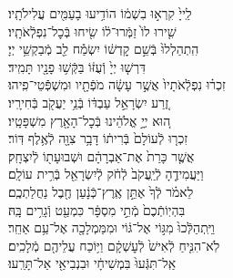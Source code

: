 \documentclass[twoside, openany, parskip=half, 11pt]{book}
\begin{document}
\begin{narrow}
לַֽייָ֙ קִרְא֣וּ בִשְׁמ֔וֹ \hfill
הוֹדִ֥יעוּ בָעַמִּ֖ים עֲלִילֹתָֽיו׃\\
שִׁ֤ירוּ לוֹ֙ זַמְּֿרוּ־ל֔וֹ \hfill שִׂ֖יחוּ בְּֿכׇל־נִפְלְֿאֹתָֽיו׃\\
הִֽתְהַלְלוּ֙ בְּֿשֵׁ֣ם קׇדְשׁ֔וֹ \hfill יִשְׂמַ֕ח לֵ֖ב מְֿבַקְשֵׁ֥י יְיָ׃\\
דִּרְשׁ֤וּ יְיָ֙ וְֿעֻזּ֔וֹ \hfill בַּקְּֿשׁ֥וּ פָנָ֖יו תָּמִֽיד׃\\
זִכְר֗וּ נִפְלְֿאֹתָיו֙ אֲשֶׁ֣ר עָשָׂ֔ה \hfill מֹפְֿתָ֖יו וּמִשְׁפְּֿֿטֵי־פִֽיהוּ׃\\
זֶ֚רַע יִשְׂרָאֵ֣ל עַבְדּ֔וֹ \hfill בְּֿנֵ֥י יַעֲקֹ֖ב בְּֿחִירָֽיו׃\\
ה֚וּא יְיָ֣ אֱלֹהֵ֔ינוּ \hfill בְּֿכׇל־הָאָ֖רֶץ מִשְׁפָּטָֽיו׃\\
זִכְר֤וּ לְֿעוֹלָם֙ בְּֿרִית֔וֹ \hfill דָּבָ֥ר צִוָּ֖ה לְֿאֶ֥לֶף דּֽוֹר׃\\
אֲשֶׁ֤ר כָּרַת֙ אֶת־אַבְרָהָ֔ם \hfill וּשְׁבוּעָת֖וֹ לְֿיִצְחָֽק׃\\
וַיַּעֲמִידֶ֤הָ לְֿיַֽעֲקֹב֙ לְֿחֹ֔ק \hfill לְֿיִשְׂרָאֵ֖ל בְּֿרִ֥ית עוֹלָֽם׃\\
לֵאמֹ֗ר לְֿךָ֙ אֶתֵּ֣ן אֶֽרֶץ־כְּֿנָ֔עַן \hfill חֶ֖בֶל נַחֲלַתְכֶֽם׃\\
בִּהְיֽוֹתְֿכֶם֙ מְֿתֵ֣י מִסְפָּ֔ר \hfill כִּמְעַ֖ט וְֿגָרִ֥ים בָּֽהּ׃\\
וַיִּֽתְהַלְּֿכוּ֙ מִגּ֣וֹי אֶל־גּ֔וֹי \hfill וּמִמַּמְלָכָ֖ה אֶל־עַ֥ם אַחֵֽר׃\\
לֹֽא־הִנִּ֤יחַ לְֿאִישׁ֙ לְֿעׇשְׁקָ֔ם \hfill וַיּ֥וֹכַח עֲלֵיהֶ֖ם מְֿלָכִֽים׃\\
אַֽל־תִּגְּֿעוּ֙ בִּמְשִׁיחָ֔י \hfill וּבִנְבִיאַ֖י אַל־תָּרֵֽעוּ׃\\


\end{narrow}
\end{document}
